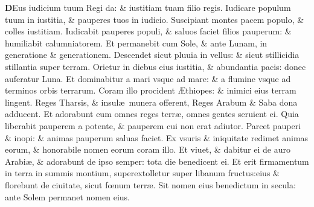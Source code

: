 \documentclass[a5paper,10pt]{book}
\def\ae{æ}
\def\AE{Æ}
\def\oe{œ}
\begin{document}
\begin{multicols*}{2}
\lettrine[lines=2]{\bfseries \color{red} D}{}Eus iudicium tuum Regi da: \& iustitiam tuam filio regis.
\newline \color{red} I\color{black}udicare populum tuum in iustitia, \& pauperes tuos in iudicio.
\newline \color{red} S\color{black}uscipiant montes pacem populo, \& colles iustitiam.
\newline \color{red} I\color{black}udicabit pauperes populi, \& saluos faciet filios pauperum: \& humiliabit calumniatorem.
\newline \color{red} E\color{black}t permanebit cum Sole, \& ante Lunam, in generatione \& generationem.
\newline \color{red} D\color{black}escendet sicut pluuia in vellus: \& sicut stillicidia stillantia super terram.
\newline \color{red} O\color{black}rietur in diebus eius iustitia, \& abundantia pacis: donec auferatur Luna.
\newline \color{red} E\color{black}t dominabitur a mari vsque ad mare: \& a flumine vsque ad terminos orbis terrarum.
\newline \color{red} C\color{black}oram illo procident \AE thiopes: \& inimici eius terram lingent.
\newline \color{red} R\color{black}eges Tharsis, \& insul\ae \ munera offerent, Reges Arabum \& Saba dona adducent.
\newline \color{red} E\color{black}t adorabunt eum omnes reges terr\ae , omnes gentes seruient ei.
\newline \color{red} Q\color{black}uia liberabit pauperem a potente, \& pauperem cui non erat adiutor.
\newline \color{red} P\color{black}arcet pauperi \& inopi: \& animas pauperum saluas faciet.
\newline \color{red} E\color{black}x vsuris \& iniquitate redimet animas eorum, \& honorabile nomen eorum coram illo.
\newline \color{red} E\color{black}t viuet, \& dabitur ei de auro Arabi\ae , \& adorabunt de ipso semper: tota die benedicent ei.
\newline \color{red} E\color{black}t erit firmamentum in terra in summis montium, superextolletur super libanum fructus:eius \& florebunt de ciuitate, sicut f\oe num terr\ae .
\newline \color{red} S\color{black}it nomen eius benedictum in secula: ante Solem permanet nomen eius.

\end{multicols*}
\end{document}
